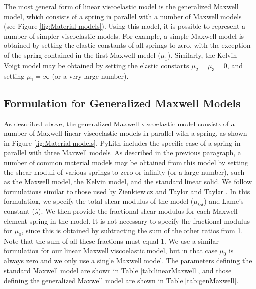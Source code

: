 The most general form of linear viscoelastic model is the generalized
Maxwell model, which consists of a spring in parallel with a number
of Maxwell models (see Figure \ref{fig:Material-models}). Using this
model, it is possible to represent a number of simpler viscoelastic
models. For example, a simple Maxwell model is obtained by setting
the elastic constants of all springs to zero, with the exception of
the spring contained in the first Maxwell model ($\mu_{1}$). Similarly,
the Kelvin-Voigt model may be obtained by setting the elastic constants
$\mu_{2}=\mu_{3}=0$, and setting $\mu_{1}=\infty$ (or a very large
number).


\subsection{Formulation for Generalized Maxwell Models\label{sub:Formulation-for-Gen-Max}}

As described above, the generalized Maxwell viscoelastic model consists
of a number of Maxwell linear viscoelastic models in parallel with
a spring, as shown in Figure \ref{fig:Material-models}. PyLith includes
the specific case of a spring in parallel with three Maxwell models.
As described in the previous paragraph, a number of common material
models may be obtained from this model by setting the shear moduli
of various springs to zero or infinity (or a large number), such as
the Maxwell model, the Kelvin model, and the standard linear solid.
We follow formulations similar to those used by Zienkiewicz and Taylor
\cite{Zienkiewicz:Taylor:2000} and Taylor \cite{Taylor:2003}. In
this formulation, we specify the total shear modulus of the model
($\mu_{tot}$) and Lame's constant ($\lambda$). We then provide the
fractional shear modulus for each Maxwell element spring in the model.
It is not necessary to specify the fractional modulus for $\mu_{0}$,
since this is obtained by subtracting the sum of the other ratios
from 1. Note that the sum of all these fractions must equal 1. We
use a similar formulation for our linear Maxwell viscoelastic model,
but in that case $\mu_{0}$ is always zero and we only use a single
Maxwell model. The parameters defining the standard Maxwell model
are shown in Table \ref{tab:linearMaxwell}, and those defining the
generalized Maxwell model are shown in Table \ref{tab:genMaxwell}.

